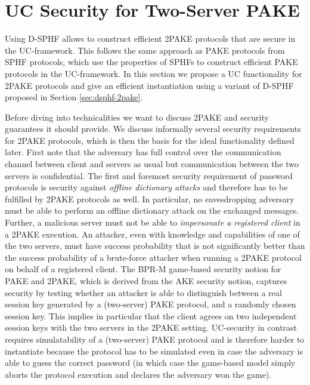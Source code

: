 \section{UC Security for Two-Server PAKE} \label{sec:uc2pake}

Using \acl{D-SPHF} allows to construct efficient \ac{2PAKE} protocols that are secure in the \ac{UC}-framework.
This follows the same approach as \ac{PAKE} protocols from \ac{SPHF} protocols, which use the properties of \acp{SPHF} to construct efficient \ac{PAKE} protocols in the \ac{UC}-framework.
In this section we propose a \ac{UC} functionality for \ac{2PAKE} protocols and give an efficient instantiation using a variant of \ac{D-SPHF} proposed in Section \ref{sec:dsphf-2pake}.

Before diving into technicalities we want to discuss \ac{2PAKE} and security guarantees it should provide.
We discuss informally several security requirements for \ac{2PAKE} protocols, which is then the basis for the ideal functionality \FTWOPAKE defined later.
First note that the adversary has full control over the communication channel between client and servers as usual but communication between the two servers is confidential.
The first and foremost security requirement of password protocols is security against \emph{offline dictionary attacks} and therefore has to be fulfilled by \ac{2PAKE} protocols as well.
In particular, no eavesdropping adversary must be able to perform an offline dictionary attack on the exchanged messages.
Further, a malicious server must not be able to \emph{impersonate a registered client} in a \ac{2PAKE} execution.
An attacker, even with knowledge and capabilities of one of the two servers, must have success probability that is not significantly better than the success probability of a brute-force attacker when running a \ac{2PAKE} protocol on behalf of a registered client.
The \ac{BPR-M} game-based security notion for \ac{PAKE} and \ac{2PAKE}, which is derived from the AKE security notion, captures security by testing whether an attacker is able to distinguish between a real session key generated by a (two-server) \ac{PAKE} protocol, and a randomly chosen session key.
This implies in particular that the client agrees on two independent session keys with the two servers in the \ac{2PAKE} setting.
\ac{UC}-security in contrast requires simulatability of a (two-server) \ac{PAKE} protocol and is therefore harder to instantiate because the protocol has to be simulated even in case the adversary is able to guess the correct password (in which case the game-based model simply aborts the protocol execution and declares the adversary won the game).

